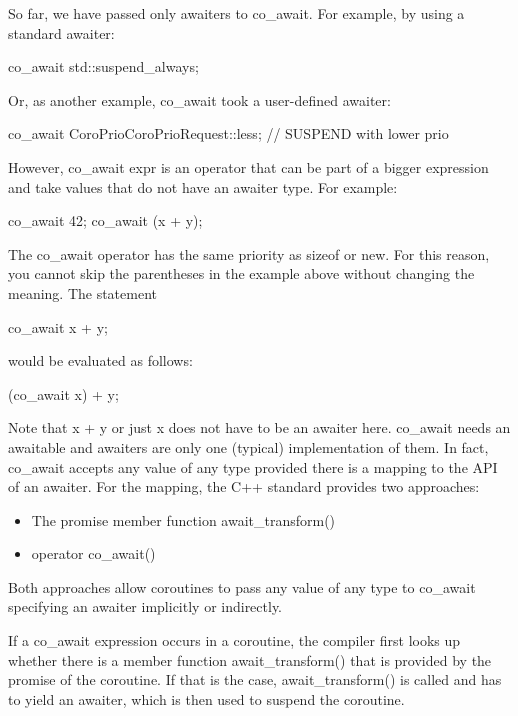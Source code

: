 
So far, we have passed only awaiters to co\_await. For example, by using a standard awaiter:

\begin{cpp}
co_await std::suspend_always{};
\end{cpp}

Or, as another example, co\_await took a user-defined awaiter:

\begin{cpp}
co_await CoroPrio{CoroPrioRequest::less}; // SUSPEND with lower prio
\end{cpp}

However, co\_await expr is an operator that can be part of a bigger expression and take values that do not have an awaiter type. For example:

\begin{cpp}
co_await 42;
co_await (x + y);
\end{cpp}

The co\_await operator has the same priority as sizeof or new. For this reason, you cannot skip the parentheses in the example above without changing the meaning. The statement

\begin{cpp}
co_await x + y;
\end{cpp}

would be evaluated as follows:

\begin{cpp}
(co_await x) + y;
\end{cpp}

Note that x + y or just x does not have to be an awaiter here. co\_await needs an awaitable and awaiters are only one (typical) implementation of them. In fact, co\_await accepts any value of any type provided there is a mapping to the API of an awaiter. For the mapping, the C++ standard provides two approaches:

\begin{itemize}
\item 
The promise member function await\_transform()

\item 
operator co\_await()
\end{itemize}

Both approaches allow coroutines to pass any value of any type to co\_await specifying an awaiter implicitly or indirectly.



If a co\_await expression occurs in a coroutine, the compiler first looks up whether there is a member function await\_transform() that is provided by the promise of the coroutine. If that is the case, await\_transform() is called and has to yield an awaiter, which is then used to suspend the coroutine.

